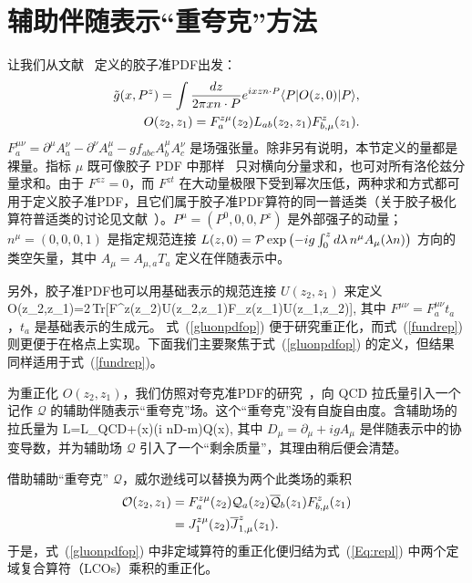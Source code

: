\section{辅助伴随表示“重夸克”方法}\label{sec:aux}

让我们从文献~\cite{Ji:2013dva} 定义的胶子准PDF出发：
\begin{align}\label{gluonpdfop}
\tilde g(x, P^z)=\int\frac{dz}{2\pi x n\cdot P}e^{i x z n\cdot P}\langle P|O(z,0)|P\rangle,\nonumber\\
O(z_2,z_1)=F_a^{z\mu}(z_2)L_{ab}(z_2, z_1)F_{b,\mu}^z(z_1).
\end{align}
$F_a^{\mu\nu}=\partial^\mu A_a^{\nu}-\partial^\nu A_a^\mu-g f_{abc}A_b^\mu A_c^\nu$ 是场强张量。除非另有说明，本节定义的量都是裸量。指标 $\mu$ 既可像胶子 PDF 中那样~\cite{Collins:1984xc} 只对横向分量求和，也可对所有洛伦兹分量求和。由于 $F^{zz}=0$，而 $F^{zt}$ 在大动量极限下受到幂次压低，两种求和方式都可用于定义胶子准PDF，且它们属于胶子准PDF算符的同一普适类（关于胶子极化算符普适类的讨论见文献~\cite{Hatta:2013gta}）。$P^\mu=(P^0, 0,0, P^z)$ 是外部强子的动量；$n^\mu=(0,0,0,1)$ 是指定规范连接 $L(z, 0) = {\cal P}\exp\left(-ig\int^z_0 d\lambda\,n^\mu  A_\mu(\lambda n)\right)$ 方向的类空矢量，其中 $A_\mu=A_{\mu, a}T_a$ 定义在伴随表示中。

另外，胶子准PDF也可以用基础表示的规范连接 $U(z_2,z_1)$ 来定义~\cite{Dorn:1981wa}
\beq\label{fundrep}
\hspace*{-1em}O(z_2,z_1)=2\,{\rm Tr}[F^{z\mu}(z_2)U(z_2,z_1)F_{z\mu}(z_1)U(z_1,z_2)],
\eeq
其中 $F^{\mu\nu}=F_{a}^{\mu\nu}t_a$，$t_a$ 是基础表示的生成元。
式~(\ref{gluonpdfop}) 便于研究重正化，而式~(\ref{fundrep}) 则更便于在格点上实现。下面我们主要聚焦于式~(\ref{gluonpdfop}) 的定义，但结果同样适用于式~(\ref{fundrep})。

为重正化 $O(z_2,z_1)$，我们仿照对夸克准PDF的研究~\cite{Ji:2017oey}，向 QCD 拉氏量引入一个记作 $\mathcal Q$ 的辅助伴随表示“重夸克”场。这个“重夸克”没有自旋自由度。含辅助场的拉氏量为
\beq\label{efflag}
\mathcal L=\mathcal L_{\rm{QCD}}+(x)(i n\cdot D-m)\mathcal Q(x),
\eeq
其中 $D_\mu=\partial_\mu+ig A_{\mu}$ 是伴随表示中的协变导数，并为辅助场 $\mathcal Q$ 引入了一个“剩余质量”，其理由稍后便会清楚。

借助辅助“重夸克” $\mathcal Q$，威尔逊线可以替换为两个此类场的乘积~\cite{Ji:2017oey}
\begin{align}\label{Eq:repl}
{\cal O}(z_2, z_1) &= F_a^{z\mu}(z_2){\mathcal Q}_a(z_2) \overline{\mathcal Q}_b(z_1) F^z_{b, \mu}(z_1)\nonumber\\
&= J_1^{z\mu}(z_2) {\overline J}_{1, \mu}^z(z_1).
\end{align}
于是，式~(\ref{gluonpdfop}) 中非定域算符的重正化便归结为式~(\ref{Eq:repl}) 中两个定域复合算符（LCOs）乘积的重正化。
